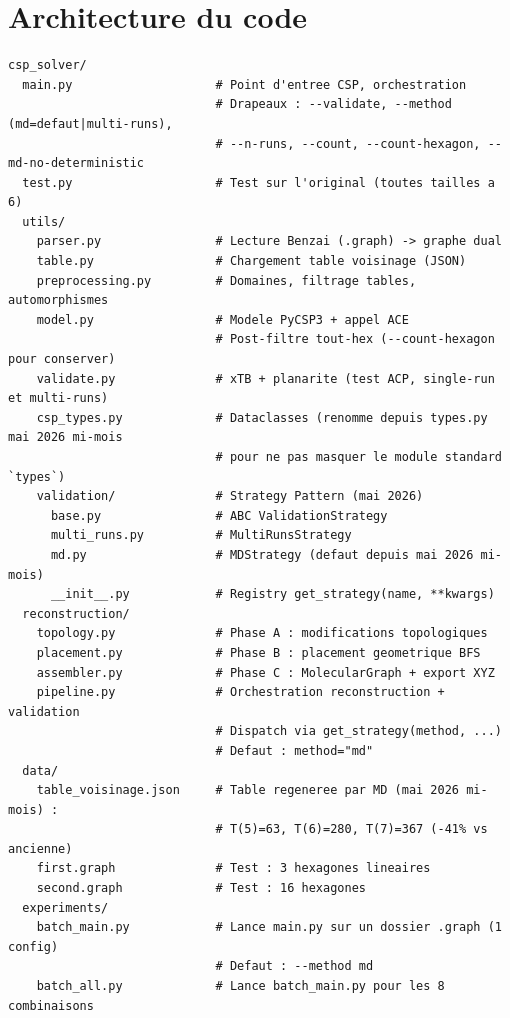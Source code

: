 \section{Architecture du code}

\begin{lstlisting}[style=benzai]
csp_solver/
  main.py                    # Point d'entree CSP, orchestration
                             # Drapeaux : --validate, --method (md=defaut|multi-runs),
                             # --n-runs, --count, --count-hexagon, --md-no-deterministic
  test.py                    # Test sur l'original (toutes tailles a 6)
  utils/
    parser.py                # Lecture Benzai (.graph) -> graphe dual
    table.py                 # Chargement table voisinage (JSON)
    preprocessing.py         # Domaines, filtrage tables, automorphismes
    model.py                 # Modele PyCSP3 + appel ACE
                             # Post-filtre tout-hex (--count-hexagon pour conserver)
    validate.py              # xTB + planarite (test ACP, single-run et multi-runs)
    csp_types.py             # Dataclasses (renomme depuis types.py mai 2026 mi-mois
                             # pour ne pas masquer le module standard `types`)
    validation/              # Strategy Pattern (mai 2026)
      base.py                # ABC ValidationStrategy
      multi_runs.py          # MultiRunsStrategy
      md.py                  # MDStrategy (defaut depuis mai 2026 mi-mois)
      __init__.py            # Registry get_strategy(name, **kwargs)
  reconstruction/
    topology.py              # Phase A : modifications topologiques
    placement.py             # Phase B : placement geometrique BFS
    assembler.py             # Phase C : MolecularGraph + export XYZ
    pipeline.py              # Orchestration reconstruction + validation
                             # Dispatch via get_strategy(method, ...)
                             # Defaut : method="md"
  data/
    table_voisinage.json     # Table regeneree par MD (mai 2026 mi-mois) :
                             # T(5)=63, T(6)=280, T(7)=367 (-41% vs ancienne)
    first.graph              # Test : 3 hexagones lineaires
    second.graph             # Test : 16 hexagones
  experiments/
    batch_main.py            # Lance main.py sur un dossier .graph (1 config)
                             # Defaut : --method md
    batch_all.py             # Lance batch_main.py pour les 8 combinaisons

\end{lstlisting}
